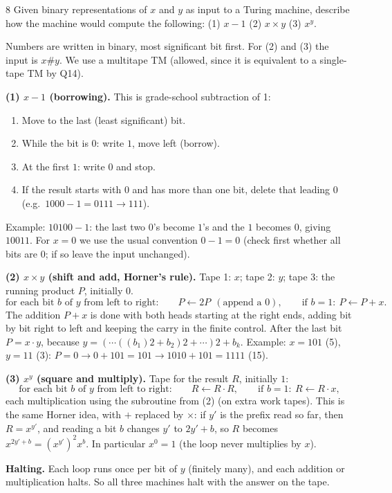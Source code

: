 \begin{question}{8}
Given binary representations of $x$ and $y$ as input to a Turing machine, describe how the machine would compute the following: (1) $x-1$ \quad (2) $x\times y$ \quad (3) $x^y$.
\end{question}
\begin{soln}
Numbers are written in binary, most significant bit first. For (2) and (3) the input is $x\#y$. We use a multitape TM (allowed, since it is equivalent to a single-tape TM by Q14).

\textbf{(1) $x-1$ (borrowing).} This is grade-school subtraction of 1:
\begin{enumerate}
\item Move to the last (least significant) bit.
\item While the bit is $0$: write $1$, move left (borrow).
\item At the first $1$: write $0$ and stop.
\item If the result starts with $0$ and has more than one bit, delete that leading $0$ (e.g.\ $1000-1=0111\to111$).
\end{enumerate}
Example: $10100-1$: the last two $0$'s become $1$'s and the $1$ becomes $0$, giving $10011$.
For $x=0$ we use the usual convention $0-1=0$ (check first whether all bits are $0$; if so leave the input unchanged).

\textbf{(2) $x\times y$ (shift and add, Horner's rule).} Tape 1: $x$; tape 2: $y$; tape 3: the running product $P$, initially $0$.
\[
\text{for each bit } b \text{ of } y \text{ from left to right:}\qquad
P\leftarrow 2P\ \ (\text{append a } 0),\qquad
\text{if } b=1:\ P\leftarrow P+x .
\]
The addition $P+x$ is done with both heads starting at the right ends, adding bit by bit right to left and keeping the carry in the finite control.
After the last bit $P=x\cdot y$, because $y=(\cdots((b_1)2+b_2)2+\cdots)2+b_k$.
Example: $x=101$ (5), $y=11$ (3): $P=0\to0+101=101\to1010+101=1111$ (15).

\textbf{(3) $x^y$ (square and multiply).} Tape for the result $R$, initially $1$:
\[
\text{for each bit } b \text{ of } y \text{ from left to right:}\qquad
R\leftarrow R\cdot R,\qquad
\text{if } b=1:\ R\leftarrow R\cdot x ,
\]
each multiplication using the subroutine from (2) (on extra work tapes).
This is the same Horner idea, with $+$ replaced by $\times$: if $y'$ is the prefix read so far, then $R=x^{y'}$, and reading a bit $b$ changes $y'$ to $2y'+b$, so $R$ becomes $x^{2y'+b}=(x^{y'})^2x^b$. In particular $x^0=1$ (the loop never multiplies by $x$).

\textbf{Halting.} Each loop runs once per bit of $y$ (finitely many), and each addition or multiplication halts. So all three machines halt with the answer on the tape.
\end{soln}

